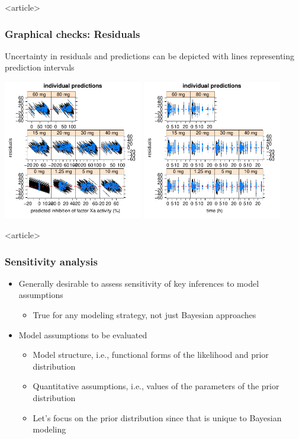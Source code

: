 \documentclass{beamer}
\begin{document}
\begin{frame}<article>
  \frametitle{Graphical checks: Residuals}
  
    Uncertainty in residuals and predictions can be depicted with lines representing prediction intervals
  \begin{center}
    \includegraphics[width=2.4in,trim=0.2in 0 0
    0,clip]{graphics/me2HandsOn2Plots028.pdf}
    \includegraphics[width=2.4in,trim=0.2in 0 0
    0,clip]{graphics/me2HandsOn2Plots029.pdf}
  \end{center}

\end{frame}

\begin{frame}<article>
  \frametitle{Sensitivity analysis}
  
  \begin{itemize}
  \item Generally desirable to assess sensitivity of key inferences to
    model assumptions
    \begin{itemize}
    \item True for any modeling strategy, not just Bayesian approaches
    \end{itemize}
  \item Model assumptions to be evaluated
    \begin{itemize}
    \item Model structure, i.e., functional forms of the likelihood
      and prior distribution
    \item Quantitative assumptions, i.e., values of the parameters of
      the prior distribution
    \item Let's focus on the prior distribution since that is unique
      to Bayesian modeling
    \end{itemize}
  \end{itemize}

\end{frame}
\end{document}
